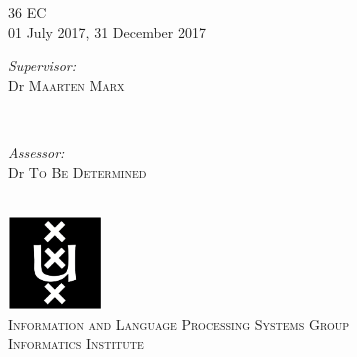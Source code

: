 \begin{titlepage}
36 EC\\ %
01 July 2017, 31 December 2017 \\[1cm]%

\begin{minipage}[t]{0.4\textwidth}
\begin{flushleft} \large
\emph{Supervisor:} \\
Dr \textsc{Maarten Marx} %
\end{flushleft}
\end{minipage}
~
\begin{minipage}[t]{0.4\textwidth}
\begin{flushright} \large
\emph{Assessor:} \\
Dr \textsc{To Be Determined}\\
\end{flushright}
\end{minipage}\\[2cm]


\includegraphics[width=2.5cm]{figures/logo-uva}\\ %
\textsc{\large Information and Language Processing Systems Group\\ Informatics Institute}\\[1.0cm] %
 

\vfill %

\end{titlepage}
\restoregeometry